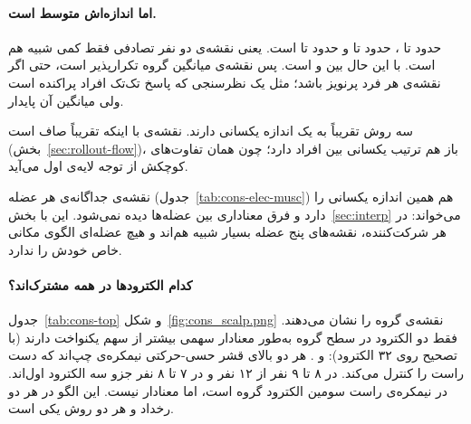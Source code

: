 \paragraph{اما اندازه‌اش متوسط است.}  حدود  تا ،  حدود  تا  و  حدود  تا  است. یعنی نقشه‌ی دو نفر تصادفی فقط کمی شبیه هم است. با این حال  بین  و  است. پس نقشه‌ی میانگین گروه تکرارپذیر است، حتی اگر نقشه‌ی هر فرد پرنویز باشد؛ مثل یک نظرسنجی که پاسخ تک‌تک افراد پراکنده است ولی میانگین آن پایدار.

سه روش تقریباً به یک اندازه یکسانی دارند. نقشه‌ی  با اینکه تقریباً صاف است (بخش~\ref{sec:rollout-flow})، باز هم ترتیب یکسانی بین افراد دارد؛ چون همان تفاوت‌های کوچکش از توجه لایه‌ی اول می‌آید.



نقشه‌ی جداگانه‌ی هر عضله (جدول~\ref{tab:cons-elec-musc}) هم همین اندازه یکسانی را دارد و فرق معناداری بین عضله‌ها دیده نمی‌شود. این با بخش~\ref{sec:interp} می‌خواند: در هر شرکت‌کننده، نقشه‌های  پنج عضله بسیار شبیه هم‌اند و هیچ عضله‌ای الگوی مکانی خاص خودش را ندارد.

\paragraph{کدام الکترودها در همه مشترک‌اند؟}
جدول~\ref{tab:cons-top} و شکل~\ref{fig:cons_scalp.png} نقشه‌ی گروه را نشان می‌دهند. فقط دو الکترود در سطح گروه به‌طور معنادار سهمی بیشتر از سهم یکنواخت دارند (با تصحیح  روی ۳۲ الکترود):  و . هر دو بالای قشر حسی-حرکتی نیمکره‌ی چپ‌اند که دست راست را کنترل می‌کند.  در ۸ تا ۹ نفر از ۱۲ نفر و  در ۷ تا ۸ نفر جزو سه الکترود اول‌اند.  در نیمکره‌ی راست سومین الکترود گروه است، اما معنادار نیست. این الگو در هر دو رخداد و هر دو روش  یکی است.



